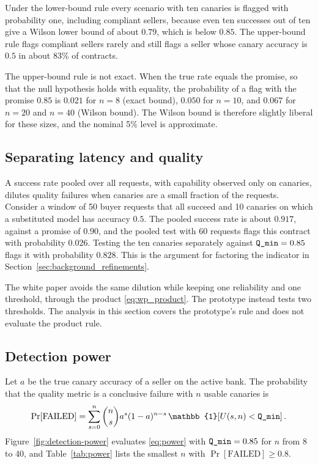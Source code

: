 Under the lower-bound rule every scenario with ten canaries is flagged with
probability one, including compliant sellers, because even ten successes out of
ten give a Wilson lower bound of about $0.79$, which is below $0.85$. The
upper-bound rule flags compliant sellers rarely and still flags a seller whose
canary accuracy is $0.5$ in about 83\% of contracts.

The upper-bound rule is not exact. When the true rate equals the promise, so
that the null hypothesis holds with equality, the probability of a flag with the
promise $0.85$ is $0.021$ for $n = 8$ (exact bound), $0.050$ for $n = 10$, and
$0.067$ for $n = 20$ and $n = 40$ (Wilson bound). The Wilson bound is therefore
slightly liberal for these sizes, and the nominal 5\% level is approximate.

\subsection{Separating latency and quality}
\label{sec:separating}

A success rate pooled over all requests, with capability observed only on
canaries, dilutes quality failures when canaries are a small fraction of the
requests. Consider a window of 50 buyer requests that all succeed and 10
canaries on which a substituted model has accuracy $0.5$. The pooled success
rate is about $0.917$, against a promise of $0.90$, and the pooled test with 60
requests flags this contract with probability $0.026$. Testing the ten canaries
separately against $\textnormal{\texttt{Q\_min}} = 0.85$ flags it with probability $0.828$. This
is the argument for factoring the indicator in
Section~\ref{sec:background_refinements}.

The white paper avoids the same dilution while keeping one reliability and one
threshold, through the product \eqref{eq:wp_product}. The prototype instead
tests two thresholds. The analysis in this section covers the prototype's rule
and does not evaluate the product rule.

\subsection{Detection power}
\label{sec:detection_power}

Let $a$ be the true canary accuracy of a seller on the active bank. The
probability that the quality metric is a conclusive failure with $n$ usable
canaries is
\begin{equation}
  \label{eq:power}
  \Pr[\text{FAILED}] = \sum_{s=0}^{n} \binom{n}{s} a^{s} (1-a)^{n-s}\,
    \mathbb{1}\!\left[U(s, n) < \qminattr\right].
\end{equation}
Figure~\ref{fig:detection-power} evaluates \eqref{eq:power} with
$\textnormal{\texttt{Q\_min}} = 0.85$ for $n$ from 8 to 40, and Table~\ref{tab:power} lists the
smallest $n$ with $\Pr[\text{FAILED}] \geq 0.8$.

